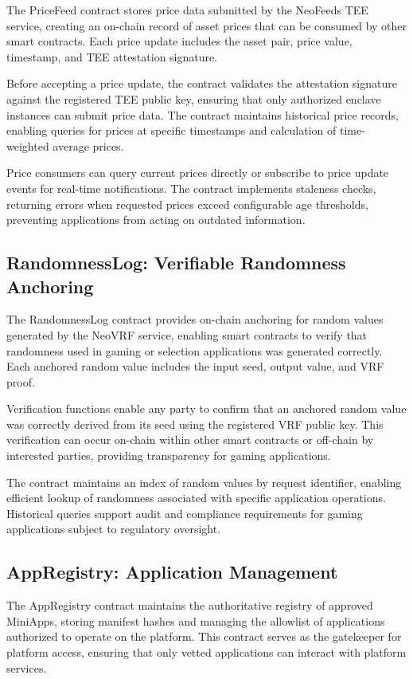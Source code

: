\documentclass[11pt,a4paper]{article}
\begin{document}
The PriceFeed contract stores price data submitted by the NeoFeeds TEE service, creating an on-chain record of asset prices that can be consumed by other smart contracts. Each price update includes the asset pair, price value, timestamp, and TEE attestation signature.

Before accepting a price update, the contract validates the attestation signature against the registered TEE public key, ensuring that only authorized enclave instances can submit price data. The contract maintains historical price records, enabling queries for prices at specific timestamps and calculation of time-weighted average prices.

Price consumers can query current prices directly or subscribe to price update events for real-time notifications. The contract implements staleness checks, returning errors when requested prices exceed configurable age thresholds, preventing applications from acting on outdated information.

\subsection{RandomnessLog: Verifiable Randomness Anchoring}

The RandomnessLog contract provides on-chain anchoring for random values generated by the NeoVRF service, enabling smart contracts to verify that randomness used in gaming or selection applications was generated correctly. Each anchored random value includes the input seed, output value, and VRF proof.

Verification functions enable any party to confirm that an anchored random value was correctly derived from its seed using the registered VRF public key. This verification can occur on-chain within other smart contracts or off-chain by interested parties, providing transparency for gaming applications.

The contract maintains an index of random values by request identifier, enabling efficient lookup of randomness associated with specific application operations. Historical queries support audit and compliance requirements for gaming applications subject to regulatory oversight.

\subsection{AppRegistry: Application Management}

The AppRegistry contract maintains the authoritative registry of approved MiniApps, storing manifest hashes and managing the allowlist of applications authorized to operate on the platform. This contract serves as the gatekeeper for platform access, ensuring that only vetted applications can interact with platform services.
\end{document}
